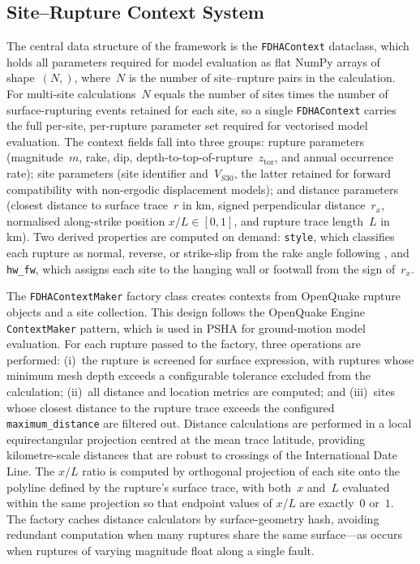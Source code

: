 \subsection{Site--Rupture Context System}
\label{sec:architecture:context}

The central data structure of the framework is the \texttt{FDHAContext} dataclass, which holds all parameters required for model evaluation as flat NumPy arrays of shape~$(N,)$, where~$N$ is the number of site--rupture pairs in the calculation. For multi-site calculations~$N$ equals the number of sites times the number of surface-rupturing events retained for each site, so a single \texttt{FDHAContext} carries the full per-site, per-rupture parameter set required for vectorised model evaluation. The context fields fall into three groups: rupture parameters (magnitude~$m$, rake, dip, depth-to-top-of-rupture~$z_{\mathrm{tor}}$, and annual occurrence rate); site parameters (site identifier and~$V_{S30}$, the latter retained for forward compatibility with non-ergodic displacement models); and distance parameters (closest distance to surface trace~$r$ in km, signed perpendicular distance~$r_x$, normalised along-strike position $x/L \in [0,1]$, and rupture trace length~$L$ in km). Two derived properties are computed on demand: \texttt{style}, which classifies each rupture as normal, reverse, or strike-slip from the rake angle following \citet{AkiRichards1980}, and \texttt{hw\_fw}, which assigns each site to the hanging wall or footwall from the sign of~$r_x$.


The \texttt{FDHAContextMaker} factory class creates contexts from OpenQuake rupture objects and a site collection. This design follows the OpenQuake Engine \texttt{ContextMaker} pattern, which is used in PSHA for ground-motion model evaluation. For each rupture passed to the factory, three operations are performed: (i)~the rupture is screened for surface expression, with ruptures whose minimum mesh depth exceeds a configurable tolerance excluded from the calculation; (ii)~all distance and location metrics are computed; and (iii)~sites whose closest distance to the rupture trace exceeds the configured \texttt{maximum\_distance} are filtered out. Distance calculations are performed in a local equirectangular projection centred at the mean trace latitude, providing kilometre-scale distances that are robust to crossings of the International Date Line. The $x/L$ ratio is computed by orthogonal projection of each site onto the polyline defined by the rupture's surface trace, with both~$x$ and~$L$ evaluated within the same projection so that endpoint values of $x/L$ are exactly~$0$ or~$1$. The factory caches distance calculators by surface-geometry hash, avoiding redundant computation when many ruptures share the same surface---as occurs when ruptures of varying magnitude float along a single fault.


